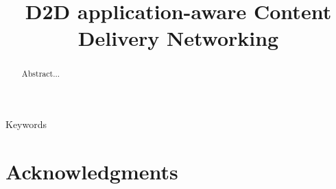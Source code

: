 \documentclass[conference]{IEEEtran}
\begin{document}
\title{D2D application-aware Content Delivery Networking}






\maketitle
\begin{abstract}
Abstract...
\end{abstract}


\begin{IEEEkeywords}
Keywords
\end{IEEEkeywords}








\section*{Acknowledgments}




\end{document}
